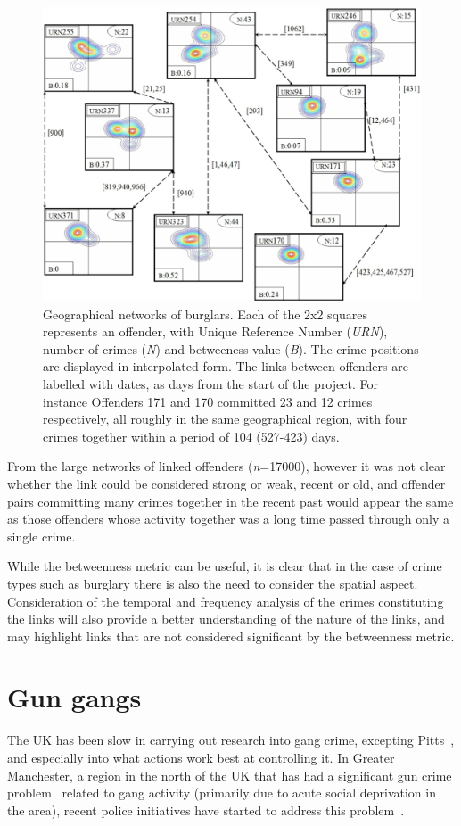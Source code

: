 \documentclass[conference]{IEEEtran}
\theoremstyle{definition}
\begin{document}
\begin{figure}[!ht] 
\centering
\includegraphics[width=\columnwidth]{images/burglary}
\caption{Geographical networks of burglars. Each of the 2x2 squares represents an offender, with Unique Reference Number (\emph{URN}), number of crimes (\emph{N}) and betweeness value (\emph{B}). The crime positions are displayed in interpolated form. The links between offenders are labelled with dates, as days from the start of the project. For instance Offenders 171 and 170 committed 23 and 12 crimes respectively, all roughly in the same geographical region, with four crimes together within a period of 104 (527-423) days. }
\label{fig:burglary}
\end{figure}

From the large networks of linked offenders (\emph{n}=17000), however
it was not clear whether the link could be considered strong or weak,
recent or old, and offender pairs committing many crimes together in
the recent past would appear the same as those offenders whose
activity together was a long time passed through only a single crime.

While the betweenness metric can be useful, it is clear that in the
case of crime types such as burglary there is also the need to consider
the spatial aspect. Consideration of the temporal and frequency
analysis of the crimes constituting the links will also provide a
better understanding of the nature of the links, and may highlight
links that are not considered significant by the betweenness metric.


\section{Gun gangs}\label{sec:manchester}
The UK has been slow in carrying out research into gang crime,
excepting Pitts~\cite{pitts:2007}, and especially into what actions
work best at controlling it. In Greater Manchester, a region in the
north of the UK that has had a significant gun crime
problem~\cite{BBCNews2003,BBCNews2004,HalesLewisSilverstone2006}
related to gang activity (primarily due to acute social deprivation in
the area), recent police initiatives have started to address this
problem~\cite{BBCNews2010}.
\end{document}
